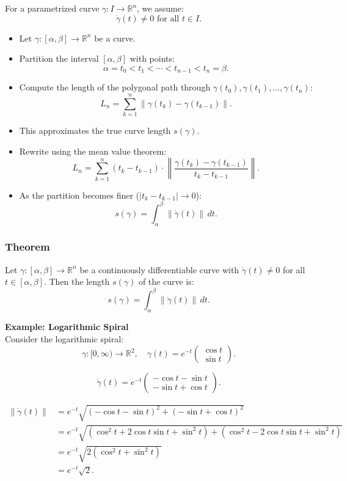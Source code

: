 \documentclass{article}
\begin{document}
For a parametrized curve \(\gamma : I \rightarrow \mathbb{R}^n\), we assume:
\[ \dot{\gamma}(t) \neq 0 \text{ for all } t \in I. \]

\begin{itemize}
    \item Let \(\gamma : [\alpha, \beta] \rightarrow \mathbb{R}^n\) be a curve.
    \item Partition the interval \([\alpha, \beta]\) with points:
    \[ \alpha = t_0 < t_1 < \cdots < t_{n-1} < t_n = \beta. \]
    \item Compute the length of the polygonal path through \(\gamma(t_0), \gamma(t_1), \ldots, \gamma(t_n)\):
    \[ L_n = \sum_{k=1}^n \|\gamma(t_k) - \gamma(t_{k-1})\|. \]
    \item This approximates the true curve length \(s(\gamma)\).
    \item Rewrite using the mean value theorem:
    \[ L_n = \sum_{k=1}^n (t_k - t_{k-1}) \cdot \left\|\frac{\gamma(t_k) - \gamma(t_{k-1})}{t_k - t_{k-1}}\right\|. \]
    \item As the partition becomes finer (\(|t_k - t_{k-1}| \rightarrow 0\)):
    \[ s(\gamma) = \int_{\alpha}^{\beta} \|\dot{\gamma}(t)\| \, dt. \]
\end{itemize}

\subsubsection{Theorem}
Let \(\gamma: [\alpha, \beta] \rightarrow \mathbb{R}^n\) be a continuously differentiable curve with \(\dot{\gamma}(t) \neq 0\) for all \(t \in [\alpha, \beta]\). Then the length \(s(\gamma)\) of the curve is:
\[ s(\gamma) = \int_{\alpha}^{\beta} \|\dot{\gamma}(t)\| \, dt. \]

\textbf{Example: Logarithmic Spiral} \\
Consider the logarithmic spiral:
\[ \gamma: [0, \infty) \rightarrow \mathbb{R}^2, \quad \gamma(t) = e^{-t} \begin{pmatrix} \cos t \\ \sin t \end{pmatrix}. \]

\[ \dot{\gamma}(t) = e^{-t} \begin{pmatrix} -\cos t - \sin t \\ -\sin t + \cos t \end{pmatrix}. \]

\begin{align*}
\|\dot{\gamma}(t)\| &= e^{-t} \sqrt{(-\cos t - \sin t)^2 + (-\sin t + \cos t)^2} \\
&= e^{-t} \sqrt{(\cos^2 t + 2\cos t \sin t + \sin^2 t) + (\cos^2 t - 2\cos t \sin t + \sin^2 t)} \\
&= e^{-t} \sqrt{2(\cos^2 t + \sin^2 t)} \\
&= e^{-t} \sqrt{2}.
\end{align*}
\end{document}
